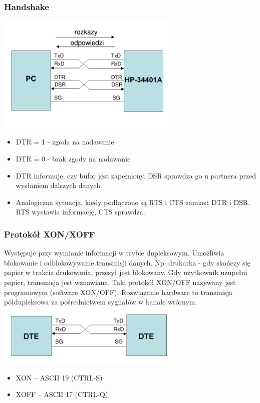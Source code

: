 		\subsubsection{Handshake}
		\includegraphics[width=9cm]{./wyklady/RS232_9_1.pdf}
		\begin{itemize}
			\item DTR = 1 - zgoda na nadawanie
			\item DTR = 0 - brak zgody na nadawanie
			\item DTR informuje, czy bufor jest zapełniony. DSR sprawdza go u partnera przed wysłaniem dalszych danych.
			\item Analogiczna sytuacja, kiedy podłączone są RTS i CTS zamiast DTR i DSR. RTS wystawia informację, CTS sprawdza.
		\end{itemize}
		\subsubsection{Protokół XON/XOFF}
		Występuje przy wymianie informacji w trybie dupleksowym. Umożliwia blokowanie i odblokowywanie transmisji danych. Np. drukarka - gdy skończy się papier w trakcie drukowania, przesył jest blokowany, Gdy użytkownik uzupełni papier, transmisja jest wznawiana. Taki protokół XON/OFF nazywany jest programowym (software XON/OFF). {\small Rozwiązanie hardware to transmisja półdupleksowa za pośrednictwem sygnałów w kanale wtórnym.}\\
		\includegraphics[width=9cm]{./wyklady/RS232_9_2.pdf}
		\begin{itemize}
			\item XON – ASCII 19 (CTRL-S)
			\item XOFF – ASCII 17 (CTRL-Q)
		\end{itemize}
